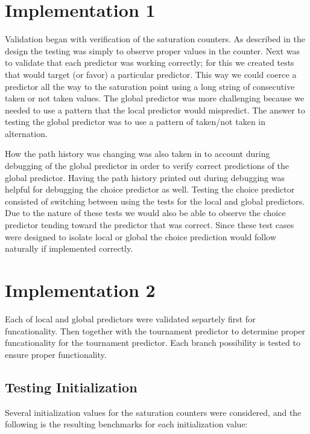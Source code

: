 \documentclass[]{report}   %
\begin{document}
\section{Implementation 1} 
\par{Validation began with verification of the saturation counters.
As described in the design the testing was simply to observe proper values in the counter.
Next was to validate that each predictor was working correctly; for this we created tests that would target (or favor) a particular predictor.
This way we could coerce a predictor all the way to the saturation point using a long string of consecutive taken or not taken values.
The global predictor was more challenging because we needed to use a pattern that the local predictor would mispredict.
The answer to testing the global predictor was to use a pattern of taken/not taken in alternation.}
\par{How the path history was changing was also taken in to account during debugging of the global predictor in order to verify correct predictions of the global predictor.
Having the path history printed out during debugging was helpful for debugging the choice predictor as well.
Testing the choice predictor consisted of switching between using the tests for the local and global predictors.
Due to the nature of these tests we would also be able to observe the choice predictor tending toward the predictor that was correct.
Since these test cases were designed to isolate local or global the choice prediction would follow naturally if implemented correctly.}

\section{Implementation 2} 
\par{Each of local and global predictors were validated separtely first for funcationality.  
Then together with the tournament predictor to determine proper funcationality for the tournament predictor.
Each branch possibility is tested to ensure proper functionality.}

\subsection{Testing Initialization}
Several initialization values for the saturation counters were considered, and the following is the resulting benchmarks for each initialization value:
\end{document}
